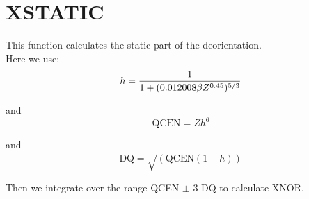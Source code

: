 \section{XSTATIC}
\label{sect:xstatic}

\noindent This function calculates the static part of the
deorientation.\\

\noindent Here we use:\\

\begin{equation}
h = {1 \over {1 + (0.012008 \beta Z^{0.45})^{5/3}}}
\end{equation}

\noindent and\\

\begin{equation}
\mathrm{QCEN} = Z h^6
\end{equation}

\noindent and\\

\begin{equation}
\mathrm{DQ} = \sqrt{(\mathrm{QCEN} (1 - h))}
\end{equation}

\noindent Then we integrate over the range QCEN $\pm$ 3 DQ to
calculate XNOR.\\
